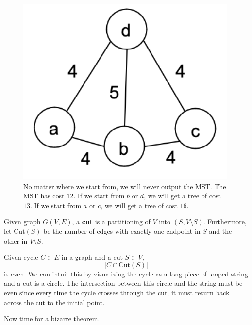 \documentclass{article}
\begin{document}
      \begin{figure}[H]
        \centering 
        \includegraphics[scale=0.6]{img/dik_mst_prob2.png}
        \caption{No matter where we start from, we will never output the MST. The MST has cost $12$. If  we start from $b$ or $d$, we will get a tree of cost $13$. If we start from $a$ or $c$, we will get a tree of cost $16$.}
        \label{fig:dik_mst_prob2}
      \end{figure}

      \begin{definition}[Cuts]      
        Given graph $G(V, E)$, a \textbf{cut} is a partitioning of $V$ into $(S, V \setminus S)$. Furthermore, let $\mathrm{Cut}(S)$ be the number of edges with exactly one endpoint in $S$ and the other in $V \setminus S$. 
      \end{definition}

      \begin{theorem}
        Given cycle $C \subset E$ in a graph and a cut $S \subset V$, 
        \begin{equation}
          | C \cap \mathrm{Cut}(S) | 
        \end{equation}
        is even. We can intuit this by visualizing the cycle as a long piece of looped string and a cut is a circle. The intersection between this circle and the string must be even since every time the cycle crosses through the cut, it must return back across the cut to the initial point.  
      \end{theorem}

      Now time for a bizarre theorem. 
\end{document}
